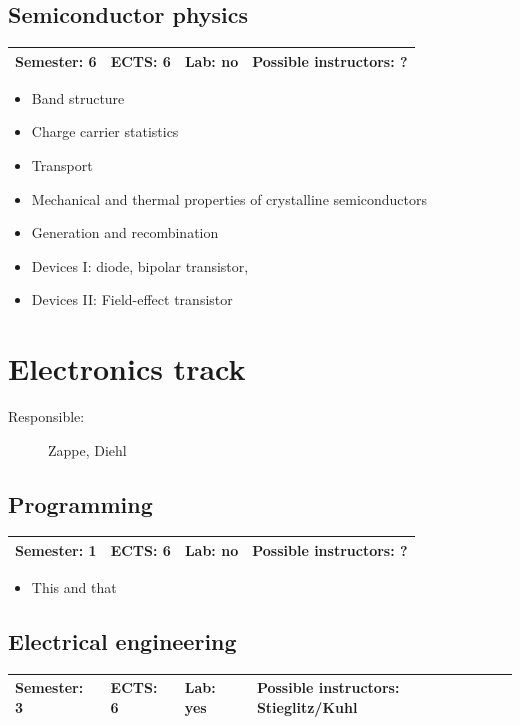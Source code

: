 \documentclass[12pt,twoside,fleqn,a4paper]{article}
\begin{document}
\subsection{Semiconductor physics}
\begin{tabular}{llll} \hline
\textbf{Semester:} 6 & \textbf{ECTS:} 6 & \textbf{Lab:} no & \textbf{Possible instructors:} ?\\
\hline
\end{tabular}

\begin{itemize}
\setlength\itemsep{0cm}
\item Band structure
\item Charge carrier statistics
\item Transport
\item Mechanical and thermal properties of crystalline semiconductors
\item Generation and recombination
\item Devices I: diode, bipolar transistor, 
\item Devices II: Field-effect transistor
\end{itemize}


\newpage
\section{Electronics track}
\begin{description}
\item[Responsible:] Zappe, Diehl
\end{description}
\vspace{1 mm}


\subsection{Programming}
\begin{tabular}{llll} \hline
\textbf{Semester:} 1 & \textbf{ECTS:} 6 & \textbf{Lab:} no & \textbf{Possible instructors:} ?\\
\hline
\end{tabular}

\begin{itemize}
\setlength\itemsep{0cm}
\item This and that
\end{itemize}


\subsection{Electrical engineering}
\begin{tabular}{llll} \hline
\textbf{Semester:} 3 & \textbf{ECTS:} 6 & \textbf{Lab:} yes & \textbf{Possible instructors:} Stieglitz/Kuhl\\
\hline
\end{tabular}
\end{document}
